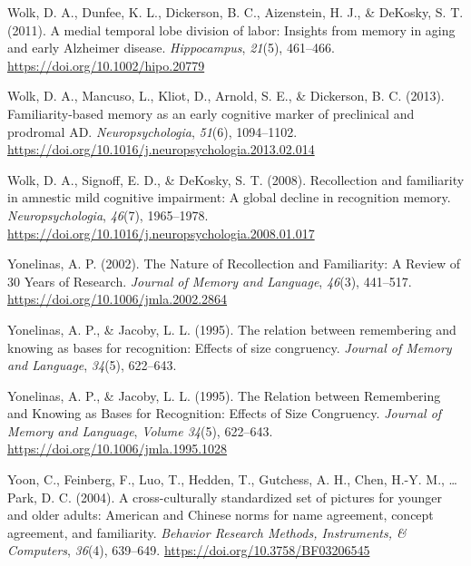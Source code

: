 \documentclass[
  11pt,
]{article}
\begin{document}
\leavevmode\hypertarget{ref-wolk2011}{}%
Wolk, D. A., Dunfee, K. L., Dickerson, B. C., Aizenstein, H. J., \&
DeKosky, S. T. (2011). A medial temporal lobe division of labor:
Insights from memory in aging and early Alzheimer disease.
\emph{Hippocampus}, \emph{21}(5), 461--466.
\url{https://doi.org/10.1002/hipo.20779}

\leavevmode\hypertarget{ref-wolk2013}{}%
Wolk, D. A., Mancuso, L., Kliot, D., Arnold, S. E., \& Dickerson, B. C.
(2013). Familiarity-based memory as an early cognitive marker of
preclinical and prodromal AD. \emph{Neuropsychologia}, \emph{51}(6),
1094--1102. \url{https://doi.org/10.1016/j.neuropsychologia.2013.02.014}

\leavevmode\hypertarget{ref-wolk2008}{}%
Wolk, D. A., Signoff, E. D., \& DeKosky, S. T. (2008). Recollection and
familiarity in amnestic mild cognitive impairment: A global decline in
recognition memory. \emph{Neuropsychologia}, \emph{46}(7), 1965--1978.
\url{https://doi.org/10.1016/j.neuropsychologia.2008.01.017}

\leavevmode\hypertarget{ref-yonelinas2002}{}%
Yonelinas, A. P. (2002). The Nature of Recollection and Familiarity: A
Review of 30 Years of Research. \emph{Journal of Memory and Language},
\emph{46}(3), 441--517. \url{https://doi.org/10.1006/jmla.2002.2864}

\leavevmode\hypertarget{ref-yonelinas1995}{}%
Yonelinas, A. P., \& Jacoby, L. L. (1995). The relation between
remembering and knowing as bases for recognition: Effects of size
congruency. \emph{Journal of Memory and Language}, \emph{34}(5),
622--643.

\leavevmode\hypertarget{ref-yonelinas1995a}{}%
Yonelinas, A. P., \& Jacoby, L. L. (1995). The Relation between
Remembering and Knowing as Bases for Recognition: Effects of Size
Congruency. \emph{Journal of Memory and Language}, \emph{Volume 34}(5),
622--643. \url{https://doi.org/10.1006/jmla.1995.1028}

\leavevmode\hypertarget{ref-yoon2004}{}%
Yoon, C., Feinberg, F., Luo, T., Hedden, T., Gutchess, A. H., Chen,
H.-Y. M., \ldots{} Park, D. C. (2004). A cross-culturally standardized
set of pictures for younger and older adults: American and Chinese norms
for name agreement, concept agreement, and familiarity. \emph{Behavior
Research Methods, Instruments, \& Computers}, \emph{36}(4), 639--649.
\url{https://doi.org/10.3758/BF03206545}
\end{document}
